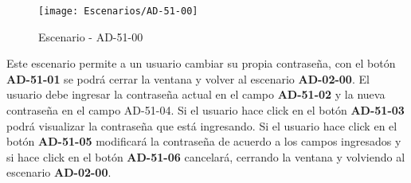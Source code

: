 \begin{figure}[H]
\centering
\texttt{[image: Escenarios/AD-51-00]}
\caption{Escenario - AD-51-00}
\label{fig:AD-51-00}
\end{figure}

Este escenario permite a un usuario cambiar su propia contraseña, con el botón \textbf{AD-51-01} se podrá cerrar la ventana y volver al escenario \textbf{AD-02-00}. El usuario debe ingresar la contraseña actual en el campo \textbf{AD-51-02} y la nueva contraseña en el campo AD-51-04. Si el usuario hace click en el botón \textbf{AD-51-03} podrá visualizar la contraseña que está ingresando. Si el usuario hace click en el botón \textbf{AD-51-05} modificará la contraseña de acuerdo a los campos ingresados y si hace click en el botón \textbf{AD-51-06} cancelará, cerrando la ventana y volviendo al escenario \textbf{AD-02-00}.
\clearpage
